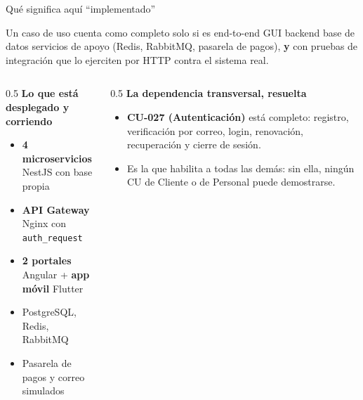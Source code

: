 \documentclass[aspectratio=169,10pt,xcolor={table}]{beamer}
\begin{document}
\begin{frame}{Qué significa aquí ``implementado''}
  \begin{block}{Un caso de uso cuenta como completo solo si es end-to-end}
    GUI  backend  base de datos  servicios de apoyo
    (Redis, RabbitMQ, pasarela de pagos), \textbf{y} con pruebas de integración que lo ejerciten
    por HTTP contra el sistema real.
  \end{block}

  \vspace{0.5em}
  \begin{columns}[T]
    \begin{column}{0.5\textwidth}
      \textbf{Lo que está desplegado y corriendo}
      \begin{itemize}\small
        \item \textbf{4 microservicios} NestJS con base propia
        \item \textbf{API Gateway} Nginx con \texttt{auth\_request}
        \item \textbf{2 portales} Angular + \textbf{app móvil} Flutter
        \item PostgreSQL, Redis, RabbitMQ
        \item Pasarela de pagos y correo simulados
      \end{itemize}
    \end{column}
    \begin{column}{0.5\textwidth}
      \textbf{La dependencia transversal, resuelta}
      \begin{itemize}\small
        \item \textbf{CU-027 (Autenticación)} está completo: registro, verificación por correo,
              login, renovación, recuperación y cierre de sesión.
        \item Es la que habilita a todas las demás: sin ella, ningún CU de Cliente o de Personal
              puede demostrarse.
      \end{itemize}
    \end{column}
  \end{columns}
\end{frame}
\end{document}
